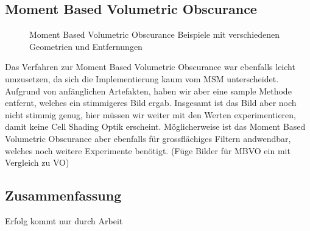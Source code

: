 \documentclass[runningheaders,a4paper]{llncs}
\begin{document}
\subsection{Moment Based Volumetric Obscurance}
\begin{figure}[H]
	\centering
	
	\caption{Moment Based Volumetric Obscurance Beispiele mit verschiedenen Geometrien und Entfernungen}
\end{figure}

Das Verfahren zur Moment Based Volumetric Obscurance war ebenfalls leicht umzusetzen, da sich die Implementierung kaum vom MSM unterscheidet. Aufgrund von anfänglichen Artefakten, haben wir aber eine sample Methode entfernt, welches ein stimmigeres Bild ergab. Insgesamt ist das Bild aber noch nicht stimmig genug, hier müssen wir weiter mit den Werten experimentieren, damit keine Cell Shading Optik erscheint. Möglicherweise ist das Moment Based Volumetric Obscurance aber ebenfalls für grossflächiges Filtern andwendbar, welches noch weitere Experimente benötigt.
(Füge Bilder für MBVO ein mit Vergleich zu VO)

\subsection{Zusammenfassung}
Erfolg kommt nur durch Arbeit\cite{blum}



\end{document}
